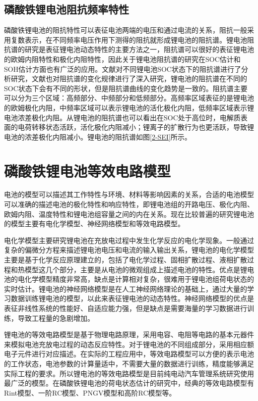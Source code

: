 \subsection{磷酸铁锂电池阻抗频率特性}
磷酸铁锂电池的阻抗特性可以表征电池两端的电压和通过电流的关系，阻抗一般采用复数表示，在不同频率电压作用下测得的阻抗就形成锂电池的阻抗谱。锂电池阻抗谱的研究是表征锂电池动态特性的主要方法之一，阻抗谱可以很好的表征锂电池的欧姆内阻特性和极化内阻特性，因此关于锂电池阻抗谱的研究在SOC估计和SOH估计方面也有广泛的应用。文献对不同锂电池SOC状态下的阻抗谱进行了分析研究，文献也对阻抗谱的变化规律进行了深入研究，锂电池的阻抗谱在不同的SOC状态下会有不同的形状，但是阻抗谱曲线的变化趋势是一致的。阻抗谱主要可以分为三个区域：高频部分、中频部分和低频部分。高频率区域表征的是锂电池的欧姆极化内阻，中频率区域可以表示锂电池的活化极化内阻，低频率区域表示锂电池浓差极化内阻。从锂电池的阻抗谱也可以看出在SOC处于高位时，电解质表面的电荷转移状态活跃，活化极化内阻减小；锂离子的扩散行为也更活跃，导致锂电池的浓差极化内阻减小。锂电池的阻抗谱如图\ref{2-SEI}所示。
\section{磷酸铁锂电池等效电路模型}
电池的模型可以描述其工作特性与环境、材料等影响因素的关系，合适的电池模型可以准确的描述电池的极化特性和响应特性，即锂电池组的开路电压、极化内阻、欧姆内阻、温度特性和锂电池组容量之间的内在关系。现在比较普遍的研究锂电池的模型主要有电化学模型、神经网络模型和等效电路模型。

电化学模型主要研究锂电池在充放电过程中发生化学反应的电化学现象。一般通过复杂的偏微分方程来描述锂电池电压和电流的输入输出关系，锂电池的电化学模型主要是基于化学反应原理建立的，包括了电化学过程、固相扩散过程、液相扩散过程和热模型这几个部分，主要是从电池的微观组成上描述电池的特性。优点是锂电池的电化学模型精度非常高，缺点是计算相对复杂，很难用于锂电池组荷电状态的实时估计。锂电池的神经网络模型是在人工神经网络理论的基础上，通过大量的学习数据训练锂电池的模型，以此来表征锂电池的动态特性。神经网络模型的优点是表征非线性系统的性能好、自适应能力强，但是缺点是需要海量的学习数据进行训练，导致工程量的急剧增加。

锂电池的等效电路模型是基于物理电路原理，采用电容、电阻等电路的基本元器件来模拟电池充放电过程的动态反应特性。对于锂电池的不同组成部分，采用相应额电子元件进行对应描述。在实际的工程应用中，等效电路模型可以方便的表示电池的工作状态，电池参数的计算量适中，不需要大量的数据进行训练，精度能够满足实际工程的要求。所以锂电池的等效电路模型是目前纯电动汽车管理系统研究使用最广泛的模型。在磷酸铁锂电池的荷电状态估计的研究中，经典的等效电路模型有Rint模型、一阶RC模型、PNGV模型和高阶RC模型等。
